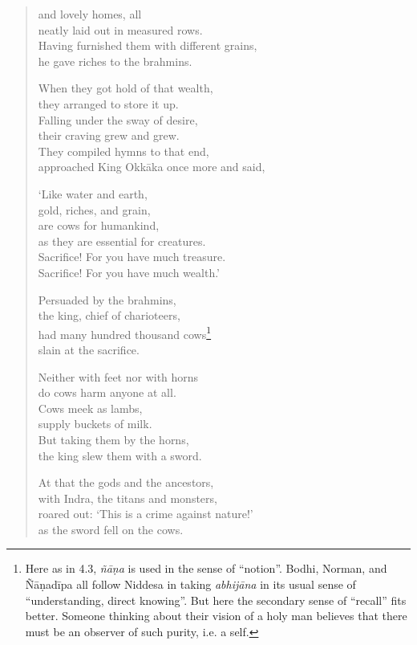 \documentclass[12pt,openany]{book}%
\begin{document}
\begin{verse}
and lovely homes, all \\
neatly laid out in measured rows. \\
Having furnished them with different grains, \\
he gave riches to the brahmins. 

When they got hold of that wealth, \\
they arranged to store it up. \\
Falling under the sway of desire, \\
their craving grew and grew. \\
They compiled hymns to that end, \\
approached King \textsanskrit{Okkāka} once more and said, 

‘Like water and earth, \\
gold, riches, and grain, \\
are cows for humankind, \\
as they are essential for creatures. \\
Sacrifice! For you have much treasure. \\
Sacrifice! For you have much wealth.’ 

Persuaded by the brahmins, \\
the king, chief of charioteers, \\
had many hundred thousand cows\footnote{Here as in 4.3, \textit{\textsanskrit{ñāṇa}} is used in the sense of “notion”. Bodhi, Norman, and \textsanskrit{Ñāṇadīpa} all follow Niddesa in taking \textit{\textsanskrit{abhijāna}} in its usual sense of “understanding, direct knowing”. But here the secondary sense of “recall” fits better. Someone thinking about their vision of a holy man believes that there must be an observer of such purity, i.e. a self. } \\
slain at the sacrifice. 

Neither with feet nor with horns \\
do cows harm anyone at all. \\
Cows meek as lambs, \\
supply buckets of milk. \\
But taking them by the horns, \\
the king slew them with a sword. 

At that the gods and the ancestors, \\
with Indra, the titans and monsters, \\
roared out: ‘This is a crime against nature!’ \\
as the sword fell on the cows. 


\end{verse}
\end{document}
